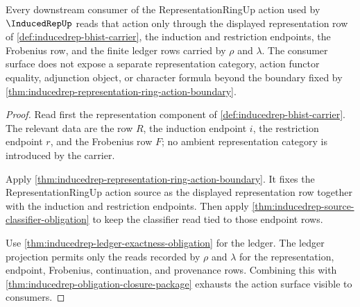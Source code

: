 \begin{theorem}
\label{thm:inducedrep-representationring-action-scope}
Every downstream consumer of the RepresentationRingUp action used by
$\InducedRepUp$ reads that action only through the displayed representation row
of \autoref{def:inducedrep-bhist-carrier}, the induction and restriction
endpoints, the Frobenius row, and the finite ledger rows carried by $\rho$ and
$\lambda$. The consumer surface does not expose a separate representation
category, action functor equality, adjunction object, or character formula
beyond the boundary fixed by
\autoref{thm:inducedrep-representation-ring-action-boundary}.
\end{theorem}
\begin{proof}
Read first the representation component of
\autoref{def:inducedrep-bhist-carrier}. The relevant data are the row $R$, the
induction endpoint $i$, the restriction endpoint $r$, and the Frobenius row
$F$; no ambient representation category is introduced by the carrier.

Apply \autoref{thm:inducedrep-representation-ring-action-boundary}. It fixes
the RepresentationRingUp action source as the displayed representation row
together with the induction and restriction endpoints. Then apply
\autoref{thm:inducedrep-source-classifier-obligation} to keep the classifier
read tied to those endpoint rows.

Use \autoref{thm:inducedrep-ledger-exactness-obligation} for the ledger. The
ledger projection permits only the reads recorded by $\rho$ and $\lambda$ for
the representation, endpoint, Frobenius, continuation, and provenance rows.
Combining this with \autoref{thm:inducedrep-obligation-closure-package}
exhausts the action surface visible to consumers.
\end{proof}

